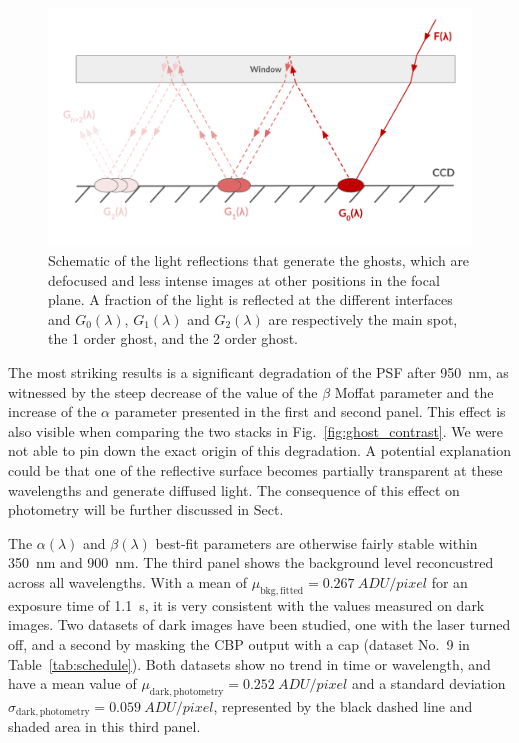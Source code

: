 \begin{figure}[h]
    \centering
    \includegraphics[width=\columnwidth]{fig/schema_ghost.pdf}
    \caption{Schematic of the light reflections that generate the ghosts, which are defocused and less intense images at other positions in the focal plane. A fraction of the light is reflected at the different interfaces and $G_0(\lambda)$, $G_1(\lambda)$ and $G_2(\lambda)$ are respectively the main spot, the 1 order ghost, and the 2 order ghost.}
    \label{fig:schema_ghost}
\end{figure}

The most striking results is a significant degradation of the PSF
after \SI{950}{nm}, as witnessed by the steep decrease of the value of
the $\beta$ Moffat parameter and the increase of the $\alpha$
parameter presented in the first and second panel. This effect is also
visible when comparing the two stacks in
Fig.~\ref{fig:ghost_contrast}. We were not able to pin down the exact
origin of this degradation. A potential explanation could be that one
of the reflective surface becomes partially transparent at these
wavelengths and generate diffused light. The consequence of this
effect on photometry will be further discussed in Sect.

The $\alpha(\lambda)$ and $\beta(\lambda)$ best-fit parameters are
otherwise fairly stable within \SI{350}{\nano\meter} and
\SI{900}{\nano\meter}. The third panel shows the background level
reconcustred across all wavelengths. With a mean of
$\mu_\mathrm{bkg, fitted}=\SI{0.267}{ADU/pixel}$ for an exposure time
of \SI{1.1}{\second}, it is very consistent with the values measured
on dark images. Two datasets of dark images have been studied, one
with the laser turned off, and a second by masking the CBP output with
a cap (dataset No.~9 in Table~\ref{tab:schedule}). Both datasets show
no trend in time or wavelength, and have a mean value of
$\mu_\mathrm{dark, photometry}=\SI{0.252}{ADU/pixel}$ and a standard
deviation $\sigma_\mathrm{dark, photometry}=\SI{0.059}{ADU/pixel}$,
represented by the black dashed line and shaded area in this third
panel.

